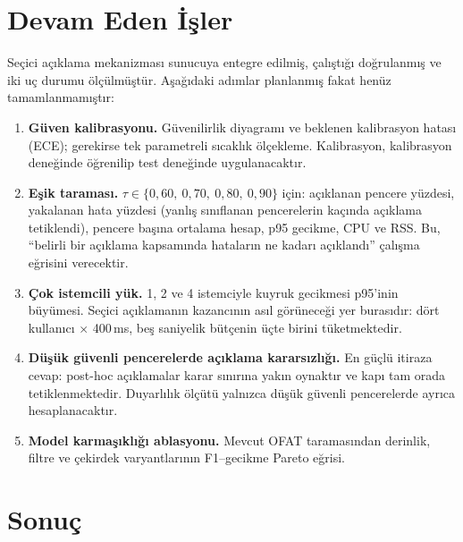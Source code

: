 \documentclass[conference]{IEEEtran}
\newcommand{\ms}{\,ms\xspace}
\begin{document}
\section{Devam Eden İşler}
\label{sec:devam}

Seçici açıklama mekanizması sunucuya entegre edilmiş, çalıştığı doğrulanmış ve
iki uç durumu ölçülmüştür. Aşağıdaki adımlar planlanmış fakat henüz
tamamlanmamıştır:

\begin{enumerate}
\item \textbf{Güven kalibrasyonu.} Güvenilirlik diyagramı ve beklenen
kalibrasyon hatası (ECE); gerekirse tek parametreli sıcaklık ölçekleme.
Kalibrasyon, kalibrasyon deneğinde öğrenilip test deneğinde uygulanacaktır.

\item \textbf{Eşik taraması.} $\tau \in \{0{,}60,\ 0{,}70,\ 0{,}80,\ 0{,}90\}$
için: açıklanan pencere yüzdesi, yakalanan hata yüzdesi (yanlış sınıflanan
pencerelerin kaçında açıklama tetiklendi), pencere başına ortalama hesap, p95
gecikme, CPU ve RSS. Bu, ``belirli bir açıklama kapsamında hataların ne kadarı
açıklandı'' çalışma eğrisini verecektir.

\item \textbf{Çok istemcili yük.} 1, 2 ve 4 istemciyle kuyruk gecikmesi p95'inin
büyümesi. Seçici açıklamanın kazancının asıl görüneceği yer burasıdır: dört
kullanıcı $\times$ 400\ms, beş saniyelik bütçenin üçte birini tüketmektedir.

\item \textbf{Düşük güvenli pencerelerde açıklama kararsızlığı.} En güçlü
itiraza cevap: post-hoc açıklamalar karar sınırına yakın oynaktır ve kapı tam
orada tetiklenmektedir. Duyarlılık ölçütü yalnızca düşük güvenli pencerelerde
ayrıca hesaplanacaktır.

\item \textbf{Model karmaşıklığı ablasyonu.} Mevcut OFAT taramasından derinlik,
filtre ve çekirdek varyantlarının F1--gecikme Pareto eğrisi.
\end{enumerate}

\section{Sonuç}
\end{document}
